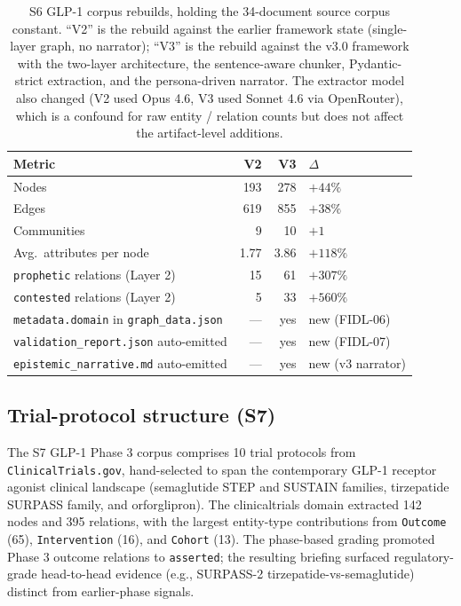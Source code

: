 \begin{table}[t]
\centering
\small
\caption{S6 GLP-1 corpus rebuilds, holding the 34-document source corpus constant. ``V2'' is the rebuild against the earlier framework state (single-layer graph, no narrator); ``V3'' is the rebuild against the v3.0 framework with the two-layer architecture, the sentence-aware chunker, Pydantic-strict extraction, and the persona-driven narrator. The extractor model also changed (V2 used Opus 4.6, V3 used Sonnet 4.6 via OpenRouter), which is a confound for raw entity / relation counts but does not affect the artifact-level additions.}
\label{tab:s6-enrichment}
\begin{tabular}{@{}lrrl@{}}
\toprule
\textbf{Metric}                                  & \textbf{V2}   & \textbf{V3}   & \textbf{$\Delta$} \\
\midrule
Nodes                                            & 193           & 278           & $+44\%$ \\
Edges                                            & 619           & 855           & $+38\%$ \\
Communities                                      & 9             & 10            & $+1$ \\
Avg.\ attributes per node                        & 1.77          & 3.86          & $+118\%$ \\
\midrule
\texttt{prophetic} relations (Layer 2)           & 15            & 61            & $+307\%$ \\
\texttt{contested} relations (Layer 2)           & 5             & 33            & $+560\%$ \\
\texttt{metadata.domain} in \texttt{graph\_data.json} & ---      & yes           & new (FIDL-06) \\
\texttt{validation\_report.json} auto-emitted    & ---           & yes           & new (FIDL-07) \\
\texttt{epistemic\_narrative.md} auto-emitted    & ---           & yes           & new (v3 narrator) \\
\bottomrule
\end{tabular}
\end{table}

\subsection{Trial-protocol structure (S7)}

The S7 GLP-1 Phase 3 corpus comprises 10 trial protocols from \texttt{ClinicalTrials.gov}, hand-selected to span the contemporary GLP-1 receptor agonist clinical landscape (semaglutide STEP and SUSTAIN families, tirzepatide SURPASS family, and orforglipron). The clinicaltrials domain extracted 142 nodes and 395 relations, with the largest entity-type contributions from \texttt{Outcome} (65), \texttt{Intervention} (16), and \texttt{Cohort} (13). The phase-based grading promoted Phase 3 outcome relations to \texttt{asserted}; the resulting briefing surfaced regulatory-grade head-to-head evidence (e.g., SURPASS-2 tirzepatide-vs-semaglutide) distinct from earlier-phase signals.

